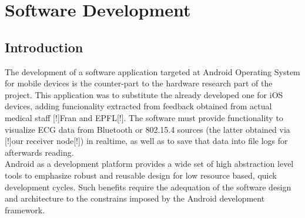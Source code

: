 \chapter{Software Development} %
\label{ch:swdev}

	\section{Introduction}
	\label{sec:sw-intro}

	The development of a software application targeted at Android Operating System for mobile devices is the counter-part to the hardware research part of the project.
	This application was to substitute the already developed one for iOS devices, adding funcionality extracted from feedback obtained from actual medical staff [!]Fran and EPFL[!]. The software must provide functionality to visualize ECG data from Bluetooth or 802.15.4 sources (the latter obtained via [!]our receiver node[!]) in realtime, as well as to save that data into file logs for afterwards reading.\\

	Android as a development platform provides a wide set of high abstraction level tools to emphasize robust and reusable design for low resource based, quick development cycles. Such benefits require the adequation of the software design and architecture to the constrains imposed by the Android development framework.\\

